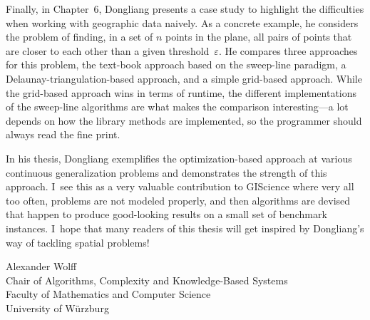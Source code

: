 {Finally, in Chapter~6, Dongliang presents a case study to highlight
the difficulties when working with geographic data naively.  As a
concrete example, he considers the problem of finding, in a set of
$n$ points in the plane, all pairs of points that are closer to each
other than a given threshold~$\varepsilon$.  He compares three
approaches for this problem, the text-book approach based on the
sweep-line paradigm, a Delaunay-triangulation-based approach, and a
simple grid-based approach.  While the grid-based approach wins in
terms of runtime, the different implementations of the sweep-line
algorithms are what makes the comparison interesting---a lot
depends on how the library methods are implemented, 
so the programmer should always read the fine print.

In his thesis, Dongliang exemplifies the optimization-based approach
at various continuous generalization problems and demonstrates the
strength of this approach.  I~see this as a very valuable
contribution to GIScience where very all too often, problems are not
modeled properly, and then algorithms are devised that happen to
produce good-looking results on a small set of benchmark instances.
I~hope that many readers of this thesis will get inspired by
Dongliang's way of tackling spatial problems!

\bigskip
\bigskip


\noindent
Alexander Wolff\\
Chair of Algorithms, 
Complexity and Knowledge-Based Systems\\
Faculty of Mathematics and Computer Science\\
University of W\"urzburg
}


